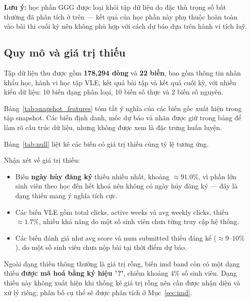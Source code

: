 \documentclass[a4paper]{report}
\newcommand{\code}[1]{{\ttfamily\def\_{\textunderscore\discretionary{}{}{}}#1}}
\def\code#1{#1}%
\def\_{ }%
\begin{document}
\textbf{Lưu ý:} học phần GGG được loại khỏi tập dữ liệu do đặc thù trọng số bất
thường đã phân tích ở trên --- kết quả của học phần này phụ thuộc hoàn toàn vào
bài thi cuối kỳ nên không phù hợp với cách dự báo dựa trên hành vi tích luỹ.

\subsection{Quy mô và giá trị thiếu}

Tập dữ liệu thu được gồm \textbf{178{,}294 dòng} và \textbf{22 biến}, bao gồm
thông tin nhân khẩu học, hành vi học tập VLE, kết quả bài tập và kết quả cuối
kỳ, với nhiều kiểu dữ liệu: 10 biến dạng phân loại, 10 biến số thực và 2 biến số
nguyên.

Bảng~\ref{tab:snapshot_features} tóm tắt ý nghĩa của các biến gốc xuất hiện
trong tập snapshot. Các biến định danh, mốc dự báo và nhãn được giữ trong bảng
để làm rõ cấu trúc dữ liệu, nhưng không được xem là đặc trưng huấn luyện.



Bảng~\ref{tab:null} liệt kê các biến có giá trị thiếu cùng tỷ lệ tương ứng.



Nhận xét về giá trị thiếu:

\begin{itemize}[leftmargin=*]
  \item Biến \textbf{ngày hủy đăng ký} thiếu nhiều nhất, khoảng $\approx 91.0\%$, vì
        phần lớn sinh viên theo học đến hết khoá nên không có ngày hủy đăng ký
        --- đây là dạng thiếu mang ý nghĩa tích cực.
  \item Các biến VLE gồm \code{total\_clicks}, \code{active\_weeks} và
        \code{avg\_weekly\_clicks}, thiếu $\approx 1.7\%$, nhiều khả năng do một
        số sinh viên chưa từng truy cập hệ thống.
  \item Các biến đánh giá như \code{avg\_score} và \code{num\_submitted} thiếu
        đáng kể ($\approx 9$--$10\%$), do một số sinh viên chưa nộp bài tại thời
        điểm dự báo.
\end{itemize}

Ngoài dạng thiếu thông thường là giá trị rỗng, biến \code{imd\_band} còn có
một dạng thiếu \textbf{được mã hoá bằng ký hiệu \code{'?'}}, chiếm khoảng $4\%$
số sinh viên. Dạng thiếu này không xuất hiện khi thống kê giá trị rỗng nên cần
được nhận diện và xử lý riêng; phân bố cụ thể sẽ được phân tích ở
Mục~\ref{sec:imd}.
\end{document}
